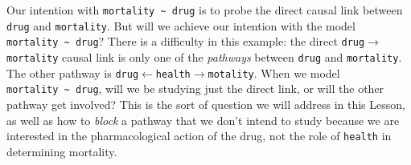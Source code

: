 \documentclass[
  letterpaper,
  DIV=11,
  numbers=noendperiod,
  oneside]{scrartcl}
\begin{document}
Our intention with \texttt{mortality\ \textasciitilde{}\ drug} is to
probe the direct causal link between \texttt{drug} and
\texttt{mortality}. But will we achieve our intention with the model
\texttt{mortality\ \textasciitilde{}\ drug}? There is a difficulty in
this example: the direct \texttt{drug}\(\rightarrow\)\texttt{mortality}
causal link is only one of the \emph{pathways} between \texttt{drug} and
\texttt{mortality}. The other pathway is
\texttt{drug}\(\leftarrow\)\texttt{health}\(\rightarrow\)\texttt{motality}.
When we model \texttt{mortality\ \textasciitilde{}\ drug}, will we be
studying just the direct link, or will the other pathway get involved?
This is the sort of question we will address in this Lesson, as well as
how to \emph{block} a pathway that we don't intend to study because we
are interested in the pharmacological action of the drug, not the role
of \texttt{health} in determining mortality.
\end{document}
